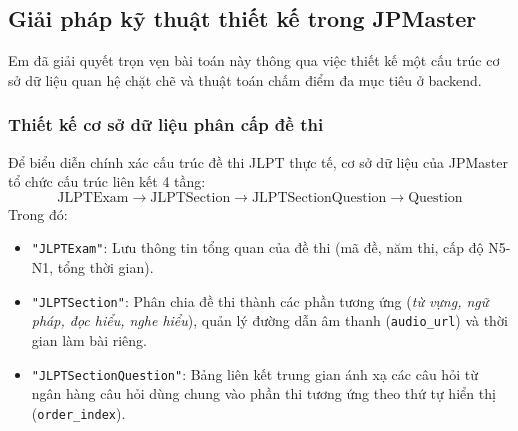 \documentclass[../DoAn.tex]{subfiles}
\begin{document}
\subsection{Giải pháp kỹ thuật thiết kế trong JPMaster}
Em đã giải quyết trọn vẹn bài toán này thông qua việc thiết kế một cấu trúc cơ sở dữ liệu quan hệ chặt chẽ và thuật toán chấm điểm đa mục tiêu ở backend.

\subsubsection{Thiết kế cơ sở dữ liệu phân cấp đề thi}
Để biểu diễn chính xác cấu trúc đề thi JLPT thực tế, cơ sở dữ liệu của JPMaster tổ chức cấu trúc liên kết 4 tầng:
\begin{equation}
    \text{JLPTExam} \longrightarrow \text{JLPTSection} \longrightarrow \text{JLPTSectionQuestion} \longrightarrow \text{Question}
\end{equation}
Trong đó:
\begin{itemize}
    \item \texttt{"JLPTExam"}: Lưu thông tin tổng quan của đề thi (mã đề, năm thi, cấp độ N5-N1, tổng thời gian).
    \item \texttt{"JLPTSection"}: Phân chia đề thi thành các phần tương ứng (\textit{từ vựng, ngữ pháp, đọc hiểu, nghe hiểu}), quản lý đường dẫn âm thanh (\texttt{audio\_url}) và thời gian làm bài riêng.
    \item \texttt{"JLPTSectionQuestion"}: Bảng liên kết trung gian ánh xạ các câu hỏi từ ngân hàng câu hỏi dùng chung vào phần thi tương ứng theo thứ tự hiển thị (\texttt{order\_index}).
\end{itemize}
\end{document}
